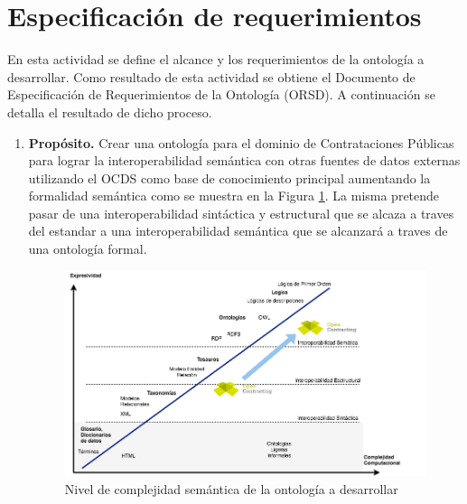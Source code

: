 \section{Especificación de requerimientos}

En esta actividad se define el alcance y los requerimientos de la ontología a desarrollar. Como resultado de esta actividad se obtiene el Documento de Especificación de Requerimientos de la Ontología (ORSD). A continuación se detalla el resultado de dicho proceso.
\begin{enumerate}
\item \textbf{Propósito.} Crear una ontología para el dominio de Contrataciones Públicas para lograr la interoperabilidad semántica con otras fuentes de datos externas utilizando el OCDS como base de conocimiento principal aumentando la formalidad semántica como se muestra en la Figura \ref{img:ocds-ocntology-complejidad}. La misma pretende pasar de una interoperabilidad sintáctica y estructural que se alcaza a traves del estandar a una interoperabilidad semántica que se alcanzará a traves de una ontología formal.

\begin{figure}[htbp!]
\centering
\includegraphics[width=150mm]{figuras/Diagramas-OenContracting.png}
\caption{Nivel de complejidad semántica de la ontología a desarrollar}
\label{img:ocds-ocntology-complejidad}
\end{figure}



\end{enumerate}
